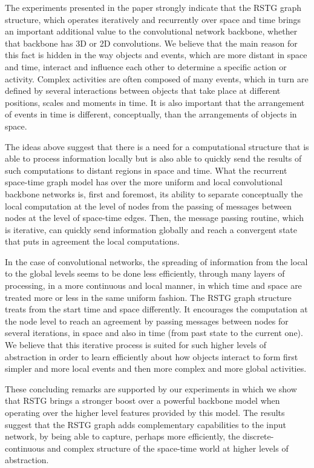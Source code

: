 \documentclass{article}
\begin{document}
The experiments presented in the paper strongly indicate that the RSTG graph structure, which operates iteratively and recurrently over space and time brings an important additional value to the convolutional network backbone, whether that backbone has 3D or 2D convolutions. We believe that the main reason for this fact is hidden in the way objects and events, which are more distant in space and time, interact and influence each other to determine a specific action or activity. Complex activities are often composed of many events, which in turn are defined by several interactions between objects that take place at different positions, scales and moments in time. It is also important that the arrangement of events in time is different, conceptually, than the arrangements of objects in space. 

The ideas above suggest that there is a need for a computational structure that is able to process information locally but is also able to quickly send the results of such computations to distant regions in space and time. What the recurrent space-time graph model has over the more uniform and local convolutional backbone networks is, first and foremost, its ability to separate conceptually the local computation at the level of nodes from the passing of messages between nodes at the level of space-time edges. Then, the message passing routine, which is iterative, can quickly send information globally and reach a convergent state that puts in agreement the local computations. 

In the case of convolutional networks, the spreading of information from the local to the global levels seems to be done less efficiently, through many layers of processing, in a more continuous and local manner, in which time and space are treated more or less in the same uniform fashion. The RSTG graph structure treats from the start time and space differently. It encourages the computation at the node level to reach an agreement by passing messages between nodes for several iterations, in space and also in time (from past state to the current one). We believe that this iterative process is suited for such higher levels of abstraction in order to learn efficiently about how objects interact to form first simpler and more local events and then more complex and more global activities.

These concluding remarks are supported by our experiments in which we show that RSTG brings a stronger boost over a powerful backbone model when operating over the higher level features provided by this model. The results suggest that the RSTG graph adds complementary capabilities to the input network, by being able to capture, perhaps more efficiently, the discrete-continuous and complex structure of the space-time world at higher levels of abstraction.
\end{document}
